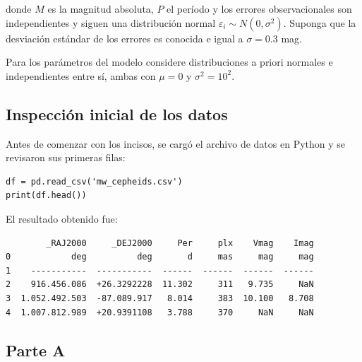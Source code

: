 \documentclass[a4paper]{article}
\begin{document}
donde $M$ es la magnitud absoluta, $P$ el período y los errores observacionales son independientes y siguen una distribución normal $\varepsilon_i \sim N(0, \sigma^2)$. Suponga que la desviación estándar de los errores es conocida e igual a $\sigma = 0.3$ mag.

Para los parámetros del modelo considere distribuciones a priori normales e independientes entre sí, ambas con $\mu = 0$ y $\sigma^2 = 10^2$.


\subsection{Inspección inicial de los datos}

Antes de comenzar con los incisos, se cargó el archivo de datos en Python y se revisaron sus primeras filas:

\begin{verbatim}
df = pd.read_csv('mw_cepheids.csv')
print(df.head())
\end{verbatim}

El resultado obtenido fue:

\begin{verbatim}
        _RAJ2000     _DEJ2000     Per     plx    Vmag    Imag
0            deg          deg       d     mas     mag     mag
1    -----------  -----------  ------  ------  ------  ------
2    916.456.086  +26.3292228  11.302     311   9.735     NaN
3  1.052.492.503  -87.089.917   8.014     383  10.100   8.708
4  1.007.812.989  +20.9391108   3.788     370     NaN     NaN
\end{verbatim}

\subsection{Parte A}
\end{document}
